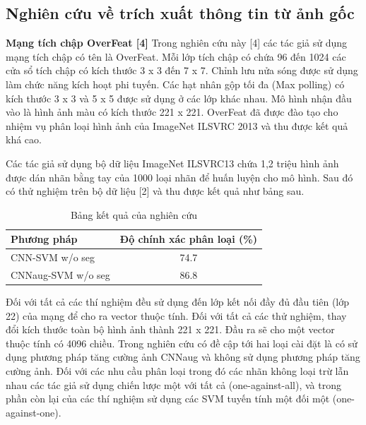 \documentclass[12pt]{report}
\begin{document}
		\subsection{Nghiên cứu về trích xuất thông tin từ ảnh gốc}
																								
		\textbf{Mạng tích chập OverFeat [4]}
		Trong nghiên cứu này [4] các tác giả sử dụng mạng tích chập có tên là OverFeat. Mỗi lớp tích chập có chứa 96 đến 1024 các cửa sổ tích chập có kích thước 3 x 3 đến 7 x 7. Chỉnh lưu nửa sóng được sử dụng làm chức năng kích hoạt phi tuyến. Các hạt nhân gộp tối đa (Max polling) có kích thước 3 x 3 và 5 x 5 được sử dụng ở các lớp khác nhau. Mô hình nhận đầu vào là hình ảnh màu có kích thước 221 x 221. OverFeat đã được đào tạo cho nhiệm vụ phân loại hình ảnh của ImageNet ILSVRC 2013 và thu được kết quả khá cao.
																						
		Các tác giả sử dụng bộ dữ liệu ImageNet ILSVRC13 chứa 1,2 triệu hình ảnh được dán nhãn bằng tay của 1000 loại nhãn để huấn luyện cho mô hình. Sau đó có thử nghiệm trên bộ dữ liệu [2] và thu được kết quả như bảng sau.
																						
		\begin{table}[h]
			\centering
			\caption{Bảng kết quả của nghiên cứu \cite{cia-CNNFeatures off-the-shelf}}
			\label{tbl:table ket qua cua Nilsback08}
			\begin{tabular}{|l|c|}
				\hline
				\textbf{Phương pháp} & \textbf{Độ chính xác phân loại (\%)} \\ \hline
				CNN-SVM w/o seg         & 74.7                                         \\ \hline
				CNNaug-SVM w/o seg      & 86.8                                         \\ \hline
																																																																																				
			\end{tabular}
		\end{table}
																				
		Đối với tất cả các thí nghiệm đều sử dụng đến lớp kết nối đầy đủ đầu tiên (lớp 22) của mạng để cho ra vector thuộc tính. Đối với tất cả các thử nghiệm, thay đổi kích thước toàn bộ hình ảnh thành 221 x 221. Đầu ra sẽ cho một vector thuộc tính có 4096 chiều. Trong nghiên cứu có đề cập tới hai loại cài đặt là có sử dụng phương pháp tăng cường ảnh CNNaug và không sử dụng phương pháp tăng cường ảnh. Đối với các nhu cầu phân loại trong đó các nhãn không loại trừ lẫn nhau các tác giả sử dụng chiến lược một với tất cả (one-against-all), và trong phần còn lại của các thí nghiệm sử dụng các SVM tuyến tính một đối một (one-against-one).
																				
\end{document}
